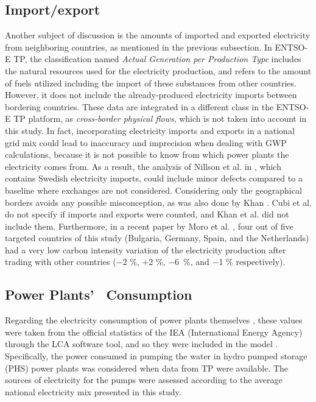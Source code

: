 {\subsection*{Import/export}
Another subject of discussion is the amounts of imported and exported  electricity from neighboring countries, as mentioned in the previous subsection. In ENTSO-E TP, the classification named \textit{Actual Generation per Production Type} includes the natural resources used for the electricity production, and refers to the amount of fuels utilized including the import of these substances from other countries. However, it does not include the already-produced electricity imports between bordering countries. These data are integrated in a different class in the ENTSO-E TP platform, as \textit{cross-border physical flows}, which is not taken into account in this study. In fact, incorporating electricity imports and exports in a national grid mix could lead to inaccuracy and imprecision when dealing with GWP calculations, because it is not possible to know from which power plants the electricity comes from. As a result, the analysis of Nillson et al. in \cite{Nilsson2017AssessingEmissions}, which contains Swedish electricity imports, could include minor defects compared to a baseline where exchanges are not considered. Considering only the geographical borders avoids any possible misconception, as was also done by Khan \cite{Khan2018}. Cubi et al. \cite{Cubi2015IncorporationAssessment} do not specify if imports and exports were counted, and Khan et al. \cite{Khan2018AnalysisIntensity} did not include them. Furthermore, in a recent paper by Moro et al. \cite{Moro2017}, four out of five targeted countries of this study (Bulgaria, Germany, Spain, and the Netherlands) had a very low carbon intensity variation of the electricity production after trading with other countries ($-$2 \%, +2 \%, $-$6~\%, and $-$1 \% respectively).



\subsection*{Power Plants{'}%
~Consumption}
Regarding {the electricity consumption of power plants themselves}%
, these values were taken from the official statistics of the IEA (International Energy Agency) through the LCA software tool, and so they were included in the model \cite{PEInternational2014GaBiV6}. Specifically, the power consumed in pumping the water in hydro pumped storage (PHS) power plants was considered when data from TP were available. The sources of electricity for the pumps were assessed according to the average national electricity mix presented in this study.

}
